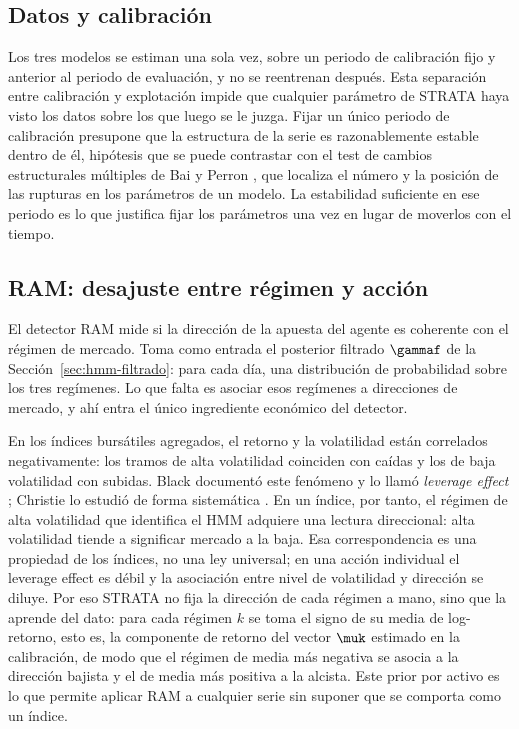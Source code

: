 \subsection{Datos y calibración}
\label{sec:strata-calib}

Los tres modelos se estiman una sola vez, sobre un periodo de calibración fijo y anterior al periodo de evaluación, y no se reentrenan después. Esta separación entre calibración y explotación impide que cualquier parámetro de STRATA haya visto los datos sobre los que luego se le juzga. Fijar un único periodo de calibración presupone que la estructura de la serie es razonablemente estable dentro de él, hipótesis que se puede contrastar con el test de cambios estructurales múltiples de Bai y Perron \cite{bai1998, bai2003}, que localiza el número y la posición de las rupturas en los parámetros de un modelo. La estabilidad suficiente en ese periodo es lo que justifica fijar los parámetros una vez en lugar de moverlos con el tiempo.

\subsection{RAM: desajuste entre régimen y acción}
\label{sec:strata-ram}

El detector RAM mide si la dirección de la apuesta del agente es coherente con el régimen de mercado. Toma como entrada el posterior filtrado $\gammaf$ de la Sección~\ref{sec:hmm-filtrado}: para cada día, una distribución de probabilidad sobre los tres regímenes. Lo que falta es asociar esos regímenes a direcciones de mercado, y ahí entra el único ingrediente económico del detector.

En los índices bursátiles agregados, el retorno y la volatilidad están correlados negativamente: los tramos de alta volatilidad coinciden con caídas y los de baja volatilidad con subidas. Black documentó este fenómeno y lo llamó \emph{leverage effect} \cite{black1976}; Christie lo estudió de forma sistemática \cite{christie1982}. En un índice, por tanto, el régimen de alta volatilidad que identifica el HMM adquiere una lectura direccional: alta volatilidad tiende a significar mercado a la baja. Esa correspondencia es una propiedad de los índices, no una ley universal; en una acción individual el leverage effect es débil y la asociación entre nivel de volatilidad y dirección se diluye. Por eso STRATA no fija la dirección de cada régimen a mano, sino que la aprende del dato: para cada régimen $k$ se toma el signo de su media de log-retorno, esto es, la componente de retorno del vector $\muk$ estimado en la calibración, de modo que el régimen de media más negativa se asocia a la dirección bajista y el de media más positiva a la alcista. Este prior por activo es lo que permite aplicar RAM a cualquier serie sin suponer que se comporta como un índice.

